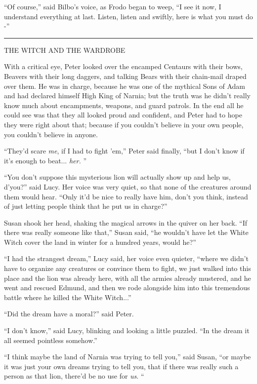 ``Of course,'' said Bilbo's voice, as Frodo began to weep, ``I see it
now, I understand everything at last. Listen, listen and swiftly, here
is what you must do -''

\begin{center}\rule{3in}{0.4pt}\end{center}

THE WITCH AND THE WARDROBE

With a critical eye, Peter looked over the encamped Centaurs with their
bows, Beavers with their long daggers, and talking Bears with their
chain-mail draped over them. He was in charge, because he was one of the
mythical Sons of Adam and had declared himself High King of Narnia; but
the truth was he didn't really know much about encampments, weapons, and
guard patrols. In the end all he could see was that they all looked
proud and confident, and Peter had to hope they were right about that;
because if you couldn't believe in your own people, you couldn't believe
in anyone.

``They'd scare \emph{me}, if I had to fight 'em,'' Peter said finally,
``but I don't know if it's enough to beat... \emph{her.} ''

``You don't suppose this mysterious lion will actually show up and help
us, d'you?'' said Lucy. Her voice was very quiet, so that none of the
creatures around them would hear. ``Only it'd be nice to really have
him, don't you think, instead of just letting people think that he put
us in charge?''

Susan shook her head, shaking the magical arrows in the quiver on her
back. ``If there was really someone like that,'' Susan said, ``he
wouldn't have let the White Witch cover the land in winter for a hundred
years, would he?''

``I had the strangest dream,'' Lucy said, her voice even quieter,
``where we didn't have to organize any creatures or convince them to
fight, we just walked into this place and the lion was already here,
with all the armies already mustered, and he went and rescued Edmund,
and then we rode alongside him into this tremendous battle where he
killed the White Witch...''

``Did the dream have a moral?'' said Peter.

``I don't know,'' said Lucy, blinking and looking a little puzzled. ``In
the dream it all seemed pointless somehow.''

``I think maybe the land of Narnia was trying to tell you,'' said Susan,
``or maybe it was just your own dreams trying to tell you, that if there
was really such a person as that lion, there'd be no use for \emph{us}.
``

